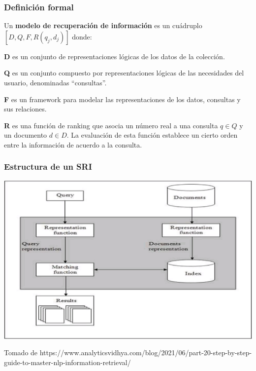 \documentclass[
	10pt, %
	aspectratio=169, %
]{beamer}
\begin{document}
\begin{frame}[fragile]
	
	\frametitle{Definición formal}
	
	\begin{alertblock}{} 
		Un \textbf{modelo de recuperación de información} es un cuádruplo $[D, Q, F, R(q_j, d_j)]$ donde:  
		
		\vspace{1\baselineskip}
		\textbf{D} es un conjunto de representaciones lógicas de los datos de la colección.
		
		\vspace{1\baselineskip}
		\textbf{Q} es un conjunto compuesto por representaciones lógicas de las necesidades del usuario, denominadas ``consultas''.
		
		\vspace{1\baselineskip}
		\textbf{F} es un framework para modelar las representaciones de los datos, consultas y sus relaciones.
		
		\vspace{1\baselineskip}
		\textbf{R} es una función de ranking que asocia un número real a una consulta $q \in Q$ y un documento $d \in D$. La evaluación de esta función establece un cierto orden entre la información de acuerdo a la consulta.
	
	\end{alertblock}
	
\end{frame}


\begin{frame}
	
	\frametitle{Estructura de un SRI}
	
	\centering
	\includegraphics[scale=0.6]{sistema_basico.png} 
	
	{\scriptsize Tomado de https://www.analyticsvidhya.com/blog/2021/06/part-20-step-by-step-guide-to-master-nlp-information-retrieval/}
	
\end{frame}
\end{document}
